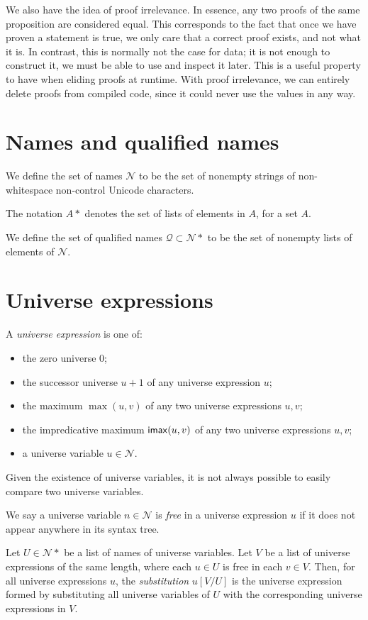 We also have the idea of proof irrelevance.
In essence, any two proofs of the same proposition are considered equal.
This corresponds to the fact that once we have proven a statement is true, we only care that a correct proof exists, and not what it is.
In contrast, this is normally not the case for data; it is not enough to construct it, we must be able to use and inspect it later.
This is a useful property to have when eliding proofs at runtime.
With proof irrelevance, we can entirely delete proofs from compiled code, since it could never use the values in any way.

\section{Names and qualified names}
\begin{defn}
	We define the set of names \( \mathcal N \) to be the set of nonempty strings of non-whitespace non-control Unicode characters.
\end{defn}
The notation \( A\ast \) denotes the set of lists of elements in \( A \), for a set \( A \).
\begin{defn}
	We define the set of qualified names \( \mathcal Q \subset \mathcal N\ast \) to be the set of nonempty lists of elements of \( \mathcal N \).
\end{defn}

\section{Universe expressions}
\begin{defn}
	A \textit{universe expression} is one of:
	\begin{itemize}
		\item the zero universe \( 0 \);
		\item the successor universe \( u + 1 \) of any universe expression \( u \);
		\item the maximum \( \max(u, v) \) of any two universe expressions \( u, v \);
		\item the impredicative maximum \( \mathsf{imax}(u, v) \) of any two universe expressions \( u, v \);
		\item a universe variable \( u \in \mathcal N \).
	\end{itemize}
\end{defn}
Given the existence of universe variables, it is not always possible to easily compare two universe variables.
\begin{defn}
	We say a universe variable \( n \in \mathcal N \) is \textit{free} in a universe expression \( u \) if it does not appear anywhere in its syntax tree.
\end{defn}
\begin{defn}
	Let \( U \in \mathcal N\ast \) be a list of names of universe variables.
	Let \( V \) be a list of universe expressions of the same length, where each \( u \in U \) is free in each \( v \in V \).
	Then, for all universe expressions \( u \), the \textit{substitution} \( u[V/U] \) is the universe expression formed by substituting all universe variables of \( U \) with the corresponding universe expressions in \( V \).
\end{defn}

